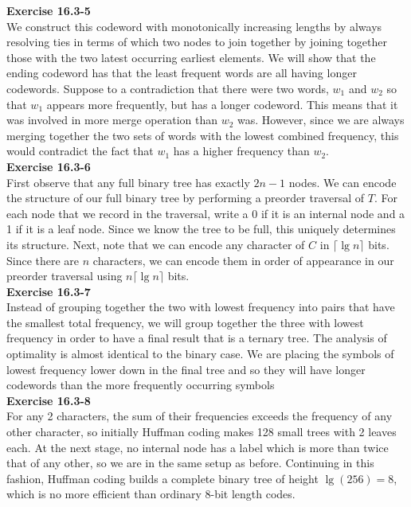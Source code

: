 \documentclass{article}
\begin{document}
\noindent\textbf{Exercise 16.3-5}\\
We construct this codeword with monotonically increasing lengths by always resolving ties in terms of which two nodes to join together by joining together those with the two latest occurring earliest elements. We will show that the ending codeword has that the least frequent words are all having longer codewords. Suppose to a contradiction that there were two words, $w_1$ and $w_2$ so that $w_1$ appears more frequently, but has a longer codeword. This means that it was involved in more merge operation than $w_2$ was. However, since we are always merging together the two sets of words with the lowest combined frequency, this would contradict the fact that $w_1$ has a higher frequency than $w_2$.\\

\noindent\textbf{Exercise 16.3-6}\\

First observe that any full binary tree has exactly $2n-1$ nodes.  We can encode the structure of our full binary tree by performing a preorder traversal of $T$.  For each node that we record in the traversal, write a 0 if it is an internal node and a 1 if it is a leaf node. Since we know the tree to be full, this uniquely determines its structure.  Next, note that we can encode any character of $C$ in $\lceil \lg n \rceil$ bits. Since there are $n$ characters, we can encode them in order of appearance in our preorder traversal using $n\lceil \lg n \rceil$ bits. \\

\noindent\textbf{Exercise 16.3-7}\\

Instead of grouping together the two with lowest frequency into pairs that have the smallest total frequency, we will group together the three with lowest frequency in order to have a final result that is a ternary tree. The analysis of optimality is almost identical to the binary case. We are placing the symbols of lowest frequency lower down in the final tree and so they will have longer codewords than the more frequently occurring symbols\\

\noindent\textbf{Exercise 16.3-8}\\

For any 2 characters, the sum of their frequencies exceeds the frequency of any other character, so initially Huffman coding makes 128 small trees with 2 leaves each.  At the next stage, no internal node has a label which is more than twice that of any other, so we are in the same setup as before.  Continuing in this fashion, Huffman coding builds a complete binary tree of height $\lg(256) = 8$, which is no more efficient than ordinary 8-bit length codes. \\
\end{document}
